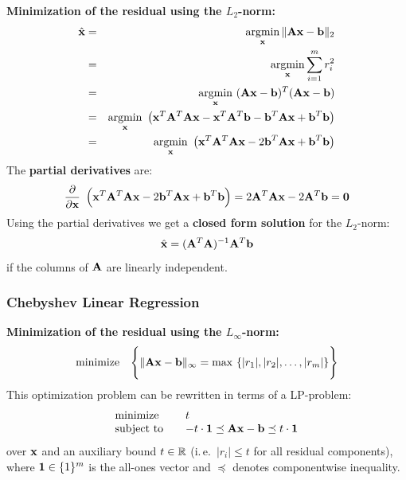   \textbf{Minimization of the residual using the $L_2$-norm:}
  \begin{eqnarray*}
    \hat{\bm{\mathrm{x}}} &=& \operatorname*{argmin}_{\bm{\mathrm{x}}} \| \mathbf{A} \bm{\mathrm{x}} -\bm{\mathrm{b}}\|_2 \\
                 &=& \operatorname*{argmin}_{\bm{\mathrm{x}}} \sum_{i=1}^m r_i^2 \\
                 &=& \operatorname*{argmin}_{\bm{\mathrm{x}}} \ (\mathbf{A} \bm{\mathrm{x}} -\bm{\mathrm{b}})^T (\mathbf{A} \bm{\mathrm{x}} -\bm{\mathrm{b}}) \\
                 &=& \operatorname*{argmin}_{\bm{\mathrm{x}}} \ \big( \bm{\mathrm{x}}^T \mathbf{A}^T \mathbf{A}\bm{\mathrm{x}} - \bm{\mathrm{x}}^T\mathbf{A}^T \bm{\mathrm{b}} - \bm{\mathrm{b}}^T \mathbf{A}\bm{\mathrm{x}} + \bm{\mathrm{b}}^T \bm{\mathrm{b}} \big) \\
                 &=& \operatorname*{argmin}_{\bm{\mathrm{x}}} \ \big( \bm{\mathrm{x}}^T \mathbf{A}^T \mathbf{A}\bm{\mathrm{x}} - 2 \bm{\mathrm{b}}^T \mathbf{A}\bm{\mathrm{x}} + \bm{\mathrm{b}}^T \bm{\mathrm{b}} \big) \\
  \end{eqnarray*}
  The \textbf{partial derivatives} are:
  \begin{displaymath}
    \frac{\partial}{\partial \bm{\mathrm{x}}} \ \left( \bm{\mathrm{x}}^T \mathbf{A}^T \mathbf{A}\bm{\mathrm{x}} - 2 \bm{\mathrm{b}}^T \mathbf{A}\bm{\mathrm{x}} + \bm{\mathrm{b}}^T \bm{\mathrm{b}} \right)
    = 2 \mathbf{A}^T \mathbf{A} \bm{\mathrm{x}} - 2 \mathbf{A}^T \bm{\mathrm{b}} = \bm{\mathrm{0}}
  \end{displaymath}
  Using the partial derivatives we get a \textbf{closed form solution} for the $L_2$-norm: 
  \begin{displaymath}
    \hat{\bm{\mathrm{x}}} = (\mathbf{A}^T \mathbf{A})^{-1}\mathbf{A}^T \bm{\mathrm{b}}
  \end{displaymath}
  if the columns of $\mathbf{A}$ are linearly independent.
 
\subsubsection{Chebyshev Linear Regression}

  \textbf{Minimization of the residual using the $L_\infty$-norm:}
  \begin{displaymath}
    \mbox{minimize}\quad \Bigg\{ \| \mathbf{A} \bm{\mathrm{x}} -\bm{\mathrm{b}}\|_\infty = \max\ \{ |r_1|, |r_2|, \dots, |r_m|\} \Bigg\}
  \end{displaymath}
  This optimization problem can be rewritten in terms of a LP-problem:
  \begin{eqnarray*}
    \begin{array}{lcl}
     \mbox{minimize}& & t\\
     \mbox{subject to} & &   - t\cdot \bm{\mathrm{1}} \preceq \mathbf{A} \bm{\mathrm{x}} - \bm{\mathrm{b}} \preceq t\cdot \bm{\mathrm{1}}
    \end{array}
  \end{eqnarray*}
  over $\bm{\mathrm{x}}$ and an auxiliary bound $t\in \mathbb{R}$ (i.\,e.\ $|r_i|\le t$ for all residual components), where $\bm{\mathrm{1}} \in \{1\}^m$ is the all-ones vector and $\preceq$ denotes componentwise inequality.


